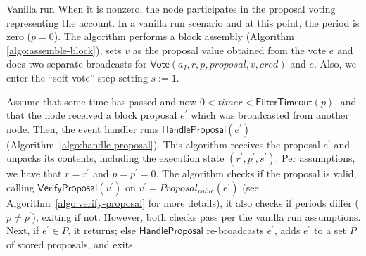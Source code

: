 \documentclass[10pt,a4paper]{article}
\begin{document}
\begin{section}{Vanilla run}
    When it is nonzero, the node participates in the proposal voting representing the account.
    In a vanilla run scenario and at this point, the period is zero ($p=0$). 
    The algorithm performs a block assembly (Algorithm \ref{algo:assemble-block}), 
    sets $v$ as the proposal value obtained from the vote $e$ and does two separate 
    broadcasts for $\mathsf{Vote}(a_I, r,p, proposal, v, cred)$ and $e$.
    Also, we enter the ``soft vote'' step setting $s:=1$.
    
    
    
    
    Assume that some time has passed and now $0<timer<\mathsf{FilterTimeout}(p)$, and that 
    the node received a block proposal $e^\prime$ which was broadcasted from another node. 
    Then, the event handler runs $\mathsf{HandleProposal}(e^\prime)$ (Algorithm~\ref{algo:handle-proposal}).
    This algorithm receives the proposal $e^\prime$ and unpacks its contents,
    including the execution state $(r^\prime,p^\prime,s^\prime)$.
    Per assumptions, we have that $r=r^\prime$ and $p=p^\prime=0$.
    The algorithm checks if the proposal is valid, calling $\mathsf{VerifyProposal}(v^\prime)$ 
    on $v^\prime=Proposal_{value}(e^\prime)$ (see Algorithm~\ref{algo:verify-proposal} for more details),
    it also checks if periods differ ($p\neq p^\prime$), exiting if not. However, both checks pass per 
    the vanilla run assumptions.
    Next, if $e^\prime\in P$, it returns; else $\mathsf{HandleProposal}$ re-broadcasts $e^\prime$, 
    adds $e^\prime$ to a set $P$ of stored proposals, and exits.
    

\end{section}
\end{document}
